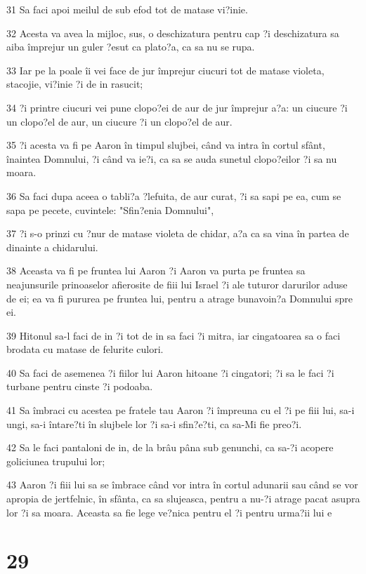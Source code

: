 \par 31 Sa faci apoi meilul de sub efod tot de matase vi?inie.
\par 32 Acesta va avea la mijloc, sus, o deschizatura pentru cap ?i deschizatura sa aiba împrejur un guler ?esut ca plato?a, ca sa nu se rupa.
\par 33 Iar pe la poale îi vei face de jur împrejur ciucuri tot de matase violeta, stacojie, vi?inie ?i de in rasucit;
\par 34 ?i printre ciucuri vei pune clopo?ei de aur de jur împrejur a?a: un ciucure ?i un clopo?el de aur, un ciucure ?i un clopo?el de aur.
\par 35 ?i acesta va fi pe Aaron în timpul slujbei, când va intra în cortul sfânt, înaintea Domnului, ?i când va ie?i, ca sa se auda sunetul clopo?eilor ?i sa nu moara.
\par 36 Sa faci dupa aceea o tabli?a ?lefuita, de aur curat, ?i sa sapi pe ea, cum se sapa pe pecete, cuvintele: "Sfin?enia Domnului",
\par 37 ?i s-o prinzi cu ?nur de matase violeta de chidar, a?a ca sa vina în partea de dinainte a chidarului.
\par 38 Aceasta va fi pe fruntea lui Aaron ?i Aaron va purta pe fruntea sa neajunsurile prinoaselor afierosite de fiii lui Israel ?i ale tuturor darurilor aduse de ei; ea va fi pururea pe fruntea lui, pentru a atrage bunavoin?a Domnului spre ei.
\par 39 Hitonul sa-l faci de in ?i tot de in sa faci ?i mitra, iar cingatoarea sa o faci brodata cu matase de felurite culori.
\par 40 Sa faci de asemenea ?i fiilor lui Aaron hitoane ?i cingatori; ?i sa le faci ?i turbane pentru cinste ?i podoaba.
\par 41 Sa îmbraci cu acestea pe fratele tau Aaron ?i împreuna cu el ?i pe fiii lui, sa-i ungi, sa-i întare?ti în slujbele lor ?i sa-i sfin?e?ti, ca sa-Mi fie preo?i.
\par 42 Sa le faci pantaloni de in, de la brâu pâna sub genunchi, ca sa-?i acopere goliciunea trupului lor;
\par 43 Aaron ?i fiii lui sa se îmbrace când vor intra în cortul adunarii sau când se vor apropia de jertfelnic, în sfânta, ca sa slujeasca, pentru a nu-?i atrage pacat asupra lor ?i sa moara. Aceasta sa fie lege ve?nica pentru el ?i pentru urma?ii lui e

\chapter{29}

